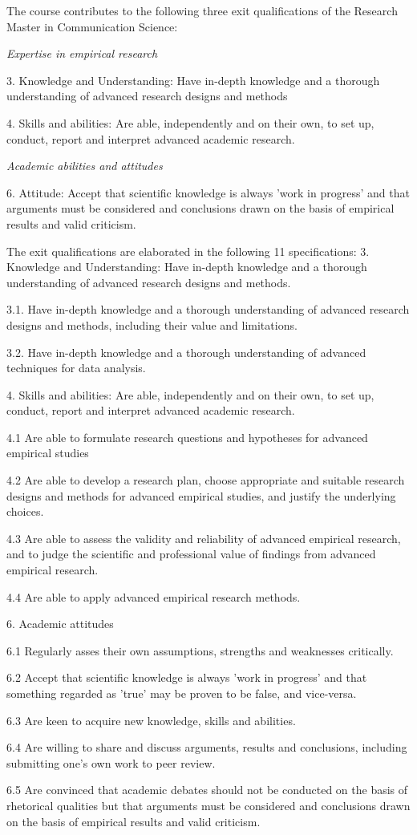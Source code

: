 

The course contributes to the following three exit qualifications of the Research Master in Communication Science:


\textit{Expertise in empirical research}


	3.	Knowledge and Understanding: Have in-depth knowledge and a thorough understanding of advanced research designs and methods


	4.	Skills and abilities: Are able, independently and on their own, to set up, conduct, report and interpret advanced academic research.


\textit{Academic abilities and attitudes}


	6.	Attitude: Accept that scientific knowledge is always 'work in progress' and that arguments must be considered and conclusions drawn on the basis of empirical results and valid criticism.


The exit qualifications are elaborated in the following 11 specifications:
3. Knowledge and Understanding: Have in-depth knowledge and a thorough understanding of advanced research designs and methods. 


3.1. Have in-depth knowledge and a thorough understanding of advanced research designs and methods, including their value and limitations.


3.2.	Have in-depth knowledge and a thorough understanding of advanced techniques for data analysis.


4. Skills and abilities: Are able, independently and on their own, to set up, conduct, report and interpret advanced academic research.


4.1	Are able to formulate research questions and hypotheses for advanced empirical studies


4.2	Are able to develop a research plan, choose appropriate and suitable research designs and methods for advanced empirical studies, and justify the underlying choices. 


4.3	Are able to assess the validity and reliability of advanced empirical research, and to judge the scientific and professional value of findings from advanced empirical research.


4.4	Are able to apply advanced empirical research methods.


6. Academic attitudes


6.1 	Regularly asses their own assumptions, strengths and weaknesses critically.


6.2	Accept that scientific knowledge is always 'work in progress' and that something regarded as 'true' may be proven to be false, and vice-versa.


6.3 	Are keen to acquire new knowledge, skills and abilities. 


6.4 	Are willing to share and discuss arguments, results and conclusions, including submitting one's own work to peer review. 


6.5 	Are convinced that academic debates should not be conducted on the basis of rhetorical qualities but that arguments must be considered and conclusions drawn on the basis of empirical results and valid criticism.
